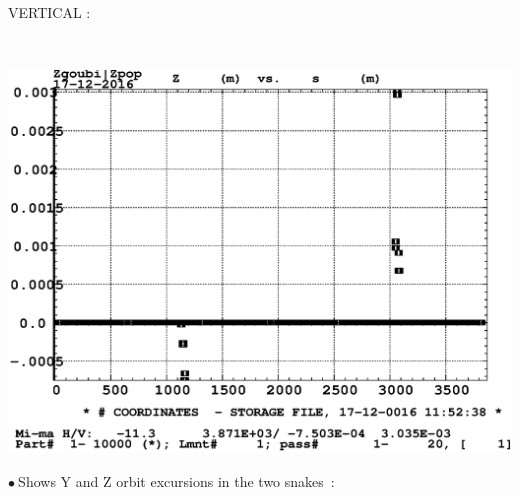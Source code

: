 \documentclass[10pt]{article}
\newcommand{\nib}{\noindent \ensuremath{\bullet~}}
\begin{document}
\begin{minipage}{1.\linewidth}
{\begin{minipage}{.49\linewidth}
~

~

VERTICAL :

~

\includegraphics*[bbllx=20,bblly=105,bburx=550,bbury=460,width=.7\linewidth]{residualOrbit_snakesOn_V.eps} 

\end{minipage}
}

\end{minipage}



\clearpage

\nib Shows Y and Z orbit excursions in the two snakes~: 


~

~
\end{document}

